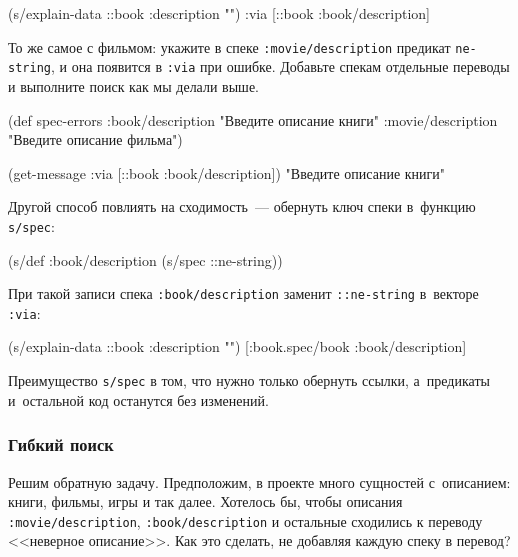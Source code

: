 \begin{english}
  \begin{clojure}
(s/explain-data ::book {:description ""})
{:via [::book :book/description]}
  \end{clojure}
\end{english}

То же самое с фильмом: укажите в спеке \verb|:movie/description| предикат
\verb|ne-string|, и она появится в \verb|:via| при ошибке. Добавьте спекам
отдельные переводы и выполните поиск как мы делали выше.

  \begin{clojure}
(def spec-errors
  {:book/description "Введите описание книги"
   :movie/description "Введите описание фильма"})

(get-message {:via [::book :book/description]})
"Введите описание книги"
  \end{clojure}

Другой способ повлиять на сходимость~--- обернуть ключ спеки в~функцию
\verb|s/spec|:

\begin{english}
  \begin{clojure}
(s/def :book/description (s/spec ::ne-string))
  \end{clojure}
\end{english}

При такой записи спека \verb|:book/description| заменит \verb|::ne-string|
в~векторе \verb|:via|:

\begin{english}
  \begin{clojure}
(s/explain-data ::book {:description ""})
[:book.spec/book :book/description]
  \end{clojure}
\end{english}

Преимущество \verb|s/spec| в том, что нужно только обернуть ссылки, а~предикаты
и~остальной код останутся без изменений.

\subsubsection{Гибкий поиск}

Решим обратную задачу. Предположим, в проекте много сущностей с~описанием:
книги, фильмы, игры и так далее. Хотелось бы, чтобы описания
\verb|:movie/description|, \verb|:book/description| и остальные сходились к
переводу <<неверное описание>>. Как это сделать, не добавляя каждую спеку в
перевод?

